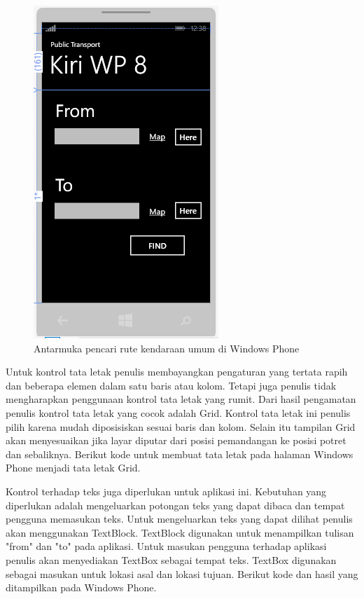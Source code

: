 \begin{figure}[h]
	\centering
		\includegraphics[scale=0.6]{Gambar/kontrol/control.PNG}
	\caption{Antarmuka pencari rute kendaraan umum di Windows Phone}
	\label{fig:antarmuka}
\end{figure}

\newpage

\hspace{0.5cm} Untuk kontrol tata letak penulis membayangkan pengaturan yang tertata rapih dan beberapa elemen dalam satu baris atau kolom. Tetapi juga penulis tidak mengharapkan penggunaan kontrol tata letak yang rumit. Dari hasil pengamatan penulis kontrol tata letak yang cocok adalah Grid. Kontrol tata letak ini penulis pilih karena mudah diposisiskan sesuai baris dan kolom. Selain itu tampilan Grid akan menyesuaikan jika layar diputar dari posisi pemandangan ke posisi potret dan sebaliknya. Berikut kode untuk membuat tata letak pada halaman Windows Phone menjadi tata letak Grid.

\hspace{0.5cm} Kontrol terhadap teks juga diperlukan untuk aplikasi ini. Kebutuhan yang diperlukan adalah mengeluarkan potongan teks yang dapat dibaca dan tempat pengguna memasukan teks. Untuk mengeluarkan teks yang dapat dilihat penulis akan menggunakan TextBlock. TextBlock digunakan untuk menampilkan tulisan "from" dan "to" pada aplikasi. Untuk masukan pengguna terhadap aplikasi penulis akan menyediakan TextBox sebagai tempat teks. TextBox digunakan sebagai masukan untuk lokasi asal dan lokasi tujuan. Berikut kode dan hasil yang ditampilkan pada Windows Phone.

